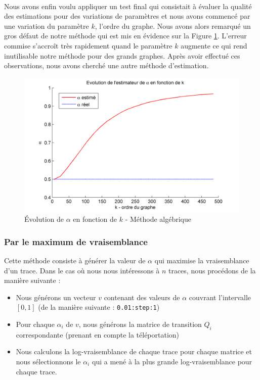 \documentclass[a4paper,titlepage]{report}
\begin{document}
\paragraph{} 
Nous avons enfin voulu appliquer un test final qui consistait à évaluer la qualité des estimations pour des variations de paramètres et nous avons commencé par une variation du paramètre $k$, l'ordre du graphe. Nous avons alors remarqué un gros défaut de notre méthode qui est mis en évidence sur la Figure \ref{fig:alpha_horrible}. L'erreur commise s'accroît très rapidement quand le paramètre $k$ augmente ce qui rend inutilisable notre méthode pour des grands graphes. Après avoir effectué ces observations, nous avons cherché une autre méthode d'estimation. 
\begin{figure}[ht]
	\center
	\includegraphics[scale=0.5]{../images/alpha_horrible.png}
	\caption{Évolution de $\alpha$ en fonction de $k$ - Méthode algébrique}
	\label{fig:alpha_horrible}
\end{figure}
\subsubsection{Par le maximum de vraisemblance}
Cette méthode consiste à générer la valeur de $\alpha$ qui maximise la vraisemblance d'un trace. Dans le cas où nous nous intéressons à $n$ traces, nous procédons de la manière suivante : 
\begin{itemize}
	\item Nous générons un vecteur $v$ contenant des valeurs de $\alpha$ couvrant l'intervalle $[0,1]$ (de la manière suivante :  \texttt{0.01:step:1})
	\item Pour chaque $\alpha_i$ de $v$, nous générons la matrice de transition $Q_i$ correspondante (prenant en compte la téléportation) 
	\item Nous calculons la log-vraisemblance de chaque trace pour chaque matrice et nous sélectionnons le $\alpha_i$ qui a mené à la plus grande log-vraisemblance pour chaque trace.
\end{itemize}
\end{document}

